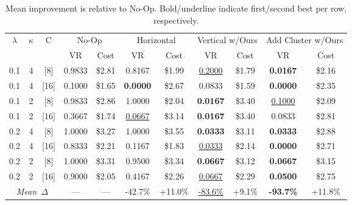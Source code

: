\documentclass{article}
\begin{document}
\begin{table}[t]
\centering
\footnotesize
\setlength{\tabcolsep}{2.5pt}
\caption{Mean improvement is relative to No-Op. Bold/underline indicate first/second best per row, respectively.}\label{tab:todo}
\begin{tabular}{c c c || c c | c c | c c | c c}
\toprule
$\lambda$ & $\kappa$ & C & \multicolumn{2}{c|}{No-Op} & \multicolumn{2}{c|}{Horizontal} & \multicolumn{2}{c|}{Vertical w/Ours} & \multicolumn{2}{c}{Add Cluster w/Ours} \\
 &  &  & VR & Cost & VR & Cost & VR & Cost & VR & Cost \\
\hline
0.1 & 4 & [8] & 0.9833 & \$2.81 & 0.8167 & \$1.99 & \underline{0.2000} & \$1.79 & \textbf{0.0167} & \$2.16 \\
0.1 & 4 & [16] & 0.1000 & \$1.65 & \textbf{0.0000} & \$2.67 & 0.0833 & \$1.59 & \textbf{0.0000} & \$2.35 \\
0.1 & 2 & [8] & 0.9833 & \$2.86 & 1.0000 & \$2.04 & \textbf{0.0167} & \$3.40 & \underline{0.1000} & \$2.09 \\
0.1 & 2 & [16] & 0.3667 & \$1.74 & \underline{0.0667} & \$3.14 & \textbf{0.0167} & \$3.40 & 0.0833 & \$2.81 \\
0.2 & 4 & [8] & 1.0000 & \$3.27 & 1.0000 & \$3.55 & \textbf{0.0333} & \$3.11 & \textbf{0.0333} & \$2.88 \\
0.2 & 4 & [16] & 0.8333 & \$2.21 & 0.1167 & \$1.83 & \underline{0.0333} & \$2.14 & \textbf{0.0000} & \$2.71 \\
0.2 & 2 & [8] & 1.0000 & \$3.31 & 0.9500 & \$3.34 & \textbf{0.0667} & \$3.12 & \textbf{0.0667} & \$3.15 \\
0.2 & 2 & [16] & 0.9000 & \$2.05 & 0.4167 & \$2.26 & \underline{0.0667} & \$2.29 & \textbf{0.0500} & \$2.75 \\
\hline
\multicolumn{3}{c||}{\textit{Mean~$\Delta$}} & --- & --- & -42.7\% & +11.0\% & \underline{-83.6\%} & +9.1\% & \textbf{-93.7\%} & +11.8\% \\
\bottomrule
\end{tabular}
\end{table}
\end{document}
